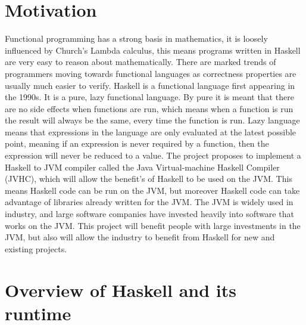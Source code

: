 \documentclass[float=false, crop=false]{standalone}
\begin{document}
\section{Motivation}

Functional programming has a strong basis in mathematics, it is
loosely influenced by Church's Lambda calculus, this means
programs written in Haskell are very easy to reason about mathematically.
There are marked trends of programmers moving towards functional 
languages as correctness properties are usually much easier to verify.
Haskell is a functional language first appearing in the 1990s.
It is a pure, lazy functional language. By pure it is meant 
that there are no side effects when functions are run, which means
when a function is run the result will always be the same, every time 
the function is run. Lazy language means that
expressions in the language are only evaluated at the latest possible
point, meaning if an expression is never required by a function, then 
the expression will never be reduced to a value.
The project proposes to implement a Haskell to JVM compiler called 
the Java Virtual-machine Haskell Compiler (JVHC), 
which will allow the benefit's of Haskell to be used on the JVM. This means
Haskell code can be run on the JVM, but moreover Haskell code
can take advantage of libraries already written for the JVM. 
The JVM is widely used in industry, and large software companies
have invested heavily into software that works on the JVM. This project
will benefit people with large investments in the JVM, 
but also will allow the industry to benefit from Haskell for new and
existing projects.



\section{Overview of Haskell and its runtime}
\end{document}
